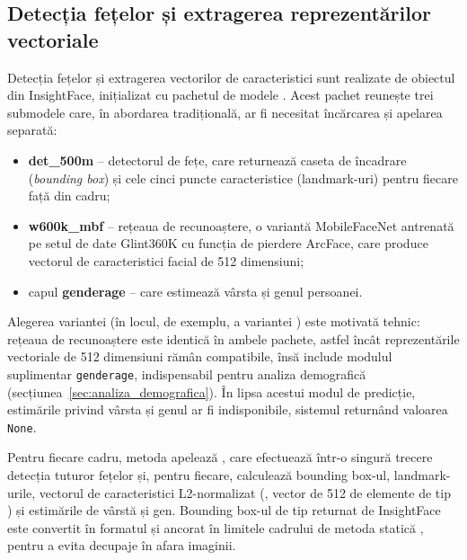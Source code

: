 \documentclass[../../main.tex]{subfiles}
\begin{document}
\subsection{Detecția fețelor și extragerea reprezentărilor vectoriale}
\label{subsec:detectie_extragere}

Detecția fețelor și extragerea vectorilor de caracteristici sunt realizate
de obiectul  din InsightFace, inițializat cu pachetul de
modele . Acest pachet reunește trei submodele care, în
abordarea tradițională, ar fi necesitat încărcarea și apelarea separată:

\begin{itemize}
    \item \textbf{det\_500m} -- detectorul de fețe, care returnează caseta de încadrare (\textit{bounding box})
    și cele cinci puncte caracteristice (landmark-uri) pentru fiecare față din cadru;
    \item \textbf{w600k\_mbf} -- rețeaua de recunoaștere, o variantă MobileFaceNet
    antrenată pe setul de date Glint360K cu funcția de pierdere ArcFace, care produce
    vectorul de caracteristici facial de 512 dimensiuni;
    \item capul \textbf{genderage} -- care estimează vârsta și genul persoanei.
\end{itemize}

Alegerea variantei  (în locul, de exemplu, a variantei ) este motivată tehnic: rețeaua de recunoaștere  este identică în ambele pachete, astfel încât reprezentările vectoriale de 512 dimensiuni rămân compatibile, însă   include modulul suplimentar \texttt{genderage}, indispensabil pentru analiza demografică (secțiunea~\ref{sec:analiza_demografica}). În lipsa acestui modul de predicție, estimările privind vârsta și genul ar fi indisponibile, sistemul returnând valoarea \texttt{None}.

Pentru fiecare cadru, metoda  apelează  , care efectuează într-o singură trecere detecția tuturor fețelor și, pentru fiecare, calculează bounding box-ul, landmark-urile, vectorul de caracteristici L2-normalizat (, vector de 512 de elemente de tip ) și estimările de vârstă și gen. Bounding box-ul de tip \inlinecode{[x1, y1, x2,} \inlinecode{y2]} returnat de InsightFace este
convertit în formatul  și ancorat în limitele cadrului de metoda statică , pentru a evita decupaje în afara imaginii.
\end{document}
